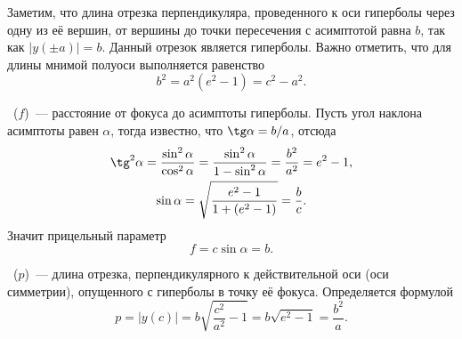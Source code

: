 Заметим, что длина отрезка перпендикуляра, проведенного к оси гиперболы через одну из её вершин, от вершины до точки пересечения с асимптотой равна $b$, так как $|y(\pm a)| = b$. Данный отрезок является  гиперболы. Важно отметить, что для длины мнимой полуоси выполняется равенство
\begin{equation*}
    b^2 = a^2 (e^2 - 1) = c^2 - a^2.
\end{equation*}

~($f$)~--- расстояние от фокуса до асимптоты гиперболы. Пусть угол наклона асимптоты равен $\alpha$, тогда известно, что $\tg \alpha = b/a$, отсюда
\begin{gather*}
    \tg^2 \alpha = \frac{\sin^2 \alpha}{\cos^2 \alpha} = \frac{\sin^2 \alpha}{1 - \sin^2 \alpha} = \frac{b^2}{a^2} = e^2 - 1,\\
    \sin \alpha =\sqrt{\frac{e^2 - 1}{1 + (e^2 - 1)}} = \frac{b}{c}.
\end{gather*}
Значит прицельный параметр
\begin{equation}
    f = c \sin \alpha = b.
\end{equation}

~($p$)~--- длина отрезка, перпендикулярного к действительной оси (оси симметрии), опущенного с гиперболы в точку её фокуса. Определяется формулой
\begin{equation}
    p= |y(c)| = b\sqrt{\frac{c^2}{a^2} - 1} = b \sqrt{e^2 - 1} = \frac{b^2}{a}.
\end{equation}

